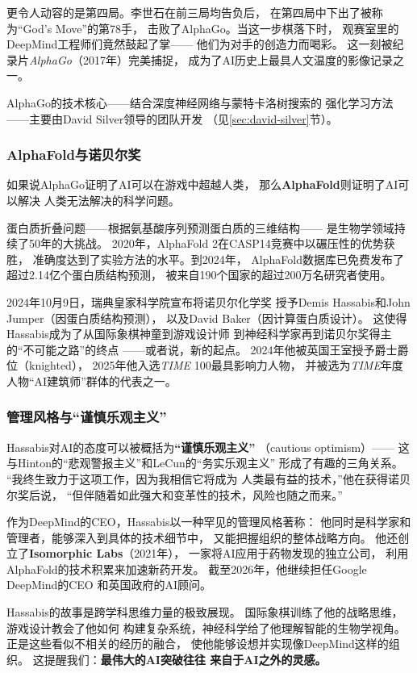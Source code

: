 更令人动容的是第四局。李世石在前三局均告负后，
在第四局中下出了被称为``God's Move''的第78手，
击败了AlphaGo。当这一步棋落下时，
观赛室里的DeepMind工程师们竟然鼓起了掌——
他们为对手的创造力而喝彩。
这一刻被纪录片\textit{AlphaGo}（2017年）完美捕捉，
成为了AI历史上最具人文温度的影像记录之一。

AlphaGo的技术核心——结合深度神经网络与蒙特卡洛树搜索的
强化学习方法——主要由David Silver领导的团队开发
（见\ref{sec:david-silver}节）。

\subsubsection{AlphaFold与诺贝尔奖}
如果说AlphaGo证明了AI可以在游戏中超越人类，
那么\textbf{AlphaFold}则证明了AI可以解决
人类无法解决的科学问题。

蛋白质折叠问题——根据氨基酸序列预测蛋白质的三维结构——
是生物学领域持续了50年的大挑战。
2020年，AlphaFold 2在CASP14竞赛中以碾压性的优势获胜，
准确度达到了实验方法的水平。到2024年，
AlphaFold数据库已免费发布了超过2.14亿个蛋白质结构预测，
被来自190个国家的超过200万名研究者使用。

2024年10月9日，瑞典皇家科学院宣布将诺贝尔化学奖
授予Demis Hassabis和John Jumper（因蛋白质结构预测），
以及David Baker（因计算蛋白质设计）。
这使得Hassabis成为了从国际象棋神童到游戏设计师
到神经科学家再到诺贝尔奖得主的``不可能之路''的终点
——或者说，新的起点。
2024年他被英国王室授予爵士爵位（knighted），
2025年他入选\textit{TIME} 100最具影响力人物，
并被选为\textit{TIME}年度人物``AI建筑师''群体的代表之一。

\subsubsection{管理风格与``谨慎乐观主义''}
Hassabis对AI的态度可以被概括为\textbf{``谨慎乐观主义''}
（cautious optimism）——
这与Hinton的``悲观警报主义''和LeCun的``务实乐观主义''
形成了有趣的三角关系。
``我终生致力于这项工作，因为我相信它将成为
人类最有益的技术，''他在获得诺贝尔奖后说，
``但伴随着如此强大和变革性的技术，风险也随之而来。''

作为DeepMind的CEO，Hassabis以一种罕见的管理风格著称：
他同时是科学家和管理者，能够深入到具体的技术细节中，
又能把握组织的整体战略方向。
他还创立了\textbf{Isomorphic Labs}（2021年），
一家将AI应用于药物发现的独立公司，
利用AlphaFold的技术积累来加速新药开发。
截至2026年，他继续担任Google DeepMind的CEO
和英国政府的AI顾问。

\begin{whybox}
Hassabis的故事是跨学科思维力量的极致展现。
国际象棋训练了他的战略思维，游戏设计教会了他如何
构建复杂系统，神经科学给了他理解智能的生物学视角。
正是这些看似不相关的经历的融合，
使他能够设想并实现像DeepMind这样的组织。
这提醒我们：\textbf{最伟大的AI突破往往
来自于AI之外的灵感。}
\end{whybox}

